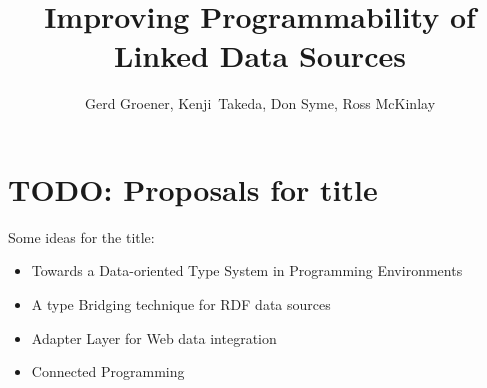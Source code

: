 \documentclass{llncs} %
\begin{document}
\title{Improving Programmability of Linked Data Sources}
 





\author{Gerd Groener, Kenji~Takeda, Don Syme, Ross McKinlay}



\maketitle

\begin{abstract}

\end{abstract}



\section{TODO: Proposals for title}

Some ideas for the title:
\begin{itemize}
	 \item Towards a Data-oriented Type System in Programming Environments

   \item A type Bridging technique for RDF data sources
	
	  \item Adapter Layer for Web data integration

   \item Connected Programming
\end{itemize}
\end{document}
